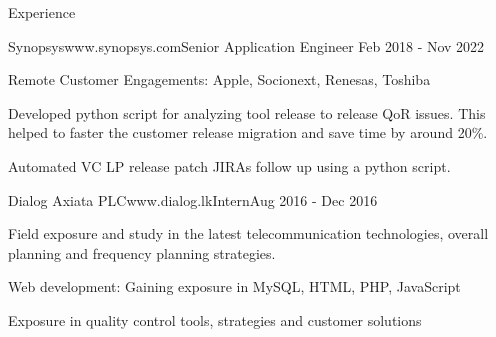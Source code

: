 \documentclass[
11pt, %
]{./assets/resume} %
\begin{document}
\begin{rSection}{Experience}
\begin{rSubsectionX}{Synopsys}{www.synopsys.com}{Senior Application Engineer }{Feb 2018 - Nov 2022}
		\item Remote Customer Engagements: Apple, Socionext, Renesas, Toshiba
		\item Developed python script for analyzing tool release to release QoR issues. This helped to faster the customer release migration and save time by around 20\%.
		\item Automated VC LP release patch JIRAs follow up using a python script. 
	\end{rSubsectionX}
	\begin{rSubsectionX}{Dialog Axiata PLC}{www.dialog.lk}{Intern}{Aug 2016 - Dec 2016}
		\item Field exposure and study in the latest telecommunication technologies, overall planning and frequency planning strategies.
		\item Web development: Gaining exposure in MySQL, HTML, PHP, JavaScript
		\item Exposure in quality control tools, strategies and customer solutions
	\end{rSubsectionX}
	
\end{rSection}


	

	
\end{document}

